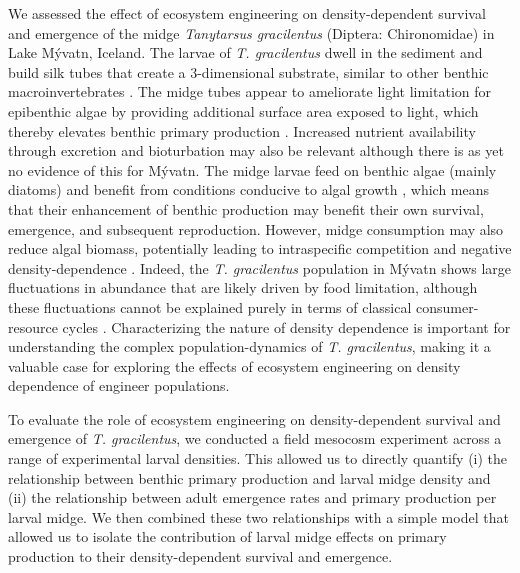 \documentclass[12pt]{article}
\begin{document}
We assessed the effect of ecosystem engineering on density-dependent 
survival and emergence of the midge \textit{Tanytarsus gracilentus} 
(Diptera: Chironomidae) in Lake M\'{y}vatn, Iceland. 
The larvae of \textit{T. gracilentus} dwell in the sediment and build silk tubes that 
create a 3-dimensional substrate, 
similar to other benthic macroinvertebrates 
\citep{largaespada2012,donadi2014,hoelker2015}.
The midge tubes appear to ameliorate light limitation for epibenthic algae by 
providing additional surface area exposed to light,
which thereby elevates benthic primary production 
\citep{herren2017, phillips2019}.
Increased nutrient availability through excretion and bioturbation may also be relevant
\citep{hoelker2015}
although there is as yet no evidence of this for M\'{y}vatn.
The midge larvae feed on benthic algae (mainly diatoms) \citep{ingvason2004} and 
benefit from conditions conducive to algal growth \citep{wetzel2021}, 
which means that their enhancement of benthic production may benefit their own 
survival, emergence, and subsequent reproduction.
However, midge consumption may also reduce algal biomass,
potentially leading to intraspecific competition and negative density-dependence 
\citep{einarsson2016}.
Indeed, the \textit{T. gracilentus} population 
in M\'{y}vatn shows large fluctuations in abundance 
that are likely driven by food limitation, although these fluctuations cannot be explained 
purely in terms of classical consumer-resource cycles \citep{ives2008}.
Characterizing the nature of density dependence is important for understanding 
the complex population-dynamics of \textit{T. gracilentus},
making it a valuable case for exploring the effects of ecosystem engineering 
on density dependence of engineer populations.

To evaluate the role of ecosystem engineering 
on density-dependent survival and emergence of \textit{T. gracilentus},
we conducted a field mesocosm experiment across a range of experimental larval densities. 
This allowed us to directly quantify
(i) the relationship between benthic primary production and larval midge density and
(ii) the relationship between adult emergence rates and primary production per larval midge.
We then combined these two relationships with a simple model 
that allowed us to isolate the contribution of larval midge effects on 
primary production to their density-dependent survival and emergence.




\end{document}

